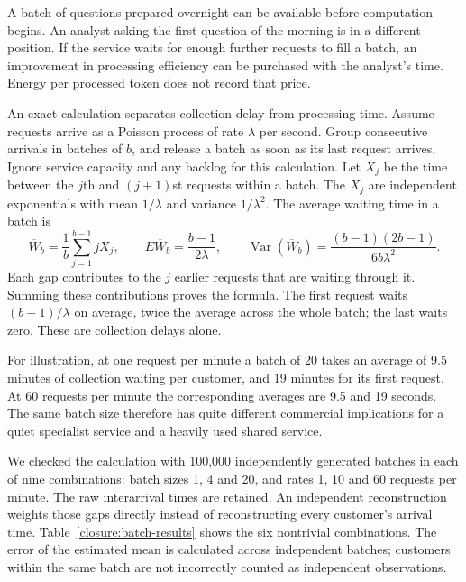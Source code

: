 A batch of questions prepared overnight can be available before computation
begins. An analyst asking the first question of the morning is in a different
position. If the service waits for enough further requests to fill a batch,
an improvement in processing efficiency can be purchased with the analyst's
time. Energy per processed token does not record that price.

An exact calculation separates collection delay from processing time.
Assume requests arrive as a Poisson process of rate $\lambda$ per second.
Group consecutive arrivals in batches of $b$, and release a batch as soon as
its last request arrives. Ignore service capacity and any backlog for this
calculation. Let $X_j$ be the time between the $j$th and $(j+1)$st requests
within a batch. The $X_j$ are independent exponentials with mean
$1/\lambda$ and variance $1/\lambda^2$. The average waiting time in a batch
is
\begin{equation}
 \overline W_b=\frac1b\sum_{j=1}^{b-1}jX_j,
 \qquad
 E\overline W_b=\frac{b-1}{2\lambda},\qquad
 \operatorname{Var}(\overline W_b)=
 \frac{(b-1)(2b-1)}{6b\lambda^2}.
 \label{closure:batch-wait}
\end{equation}
Each gap contributes to the $j$ earlier requests that are waiting through
it. Summing these contributions proves the formula. The first request waits
$(b-1)/\lambda$ on average, twice the average across the whole batch;
the last waits zero. These are collection delays alone.

For illustration, at one request per minute a batch of 20 takes an average
of 9.5 minutes of collection waiting per customer, and 19 minutes for its
first request. At 60 requests per minute the corresponding averages are
9.5 and 19 seconds. The same batch size therefore has quite different
commercial implications for a quiet specialist service and a heavily used
shared service.

We checked the calculation with 100,000 independently generated batches in
each of nine combinations: batch sizes 1, 4 and 20, and rates 1, 10 and
60 requests per minute. The raw interarrival times are retained. An
independent reconstruction weights those gaps directly instead of
reconstructing every customer's arrival time. Table~\ref{closure:batch-results}
shows the six nontrivial combinations. The error of the estimated mean is
calculated across independent batches; customers within the same batch are
not incorrectly counted as independent observations.

